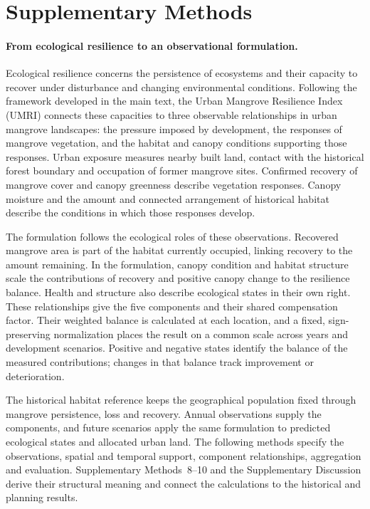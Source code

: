 \tableofcontents
\clearpage

\section{Supplementary Methods}

\paragraph{From ecological resilience to an observational formulation.}
Ecological resilience concerns the persistence of ecosystems and their capacity to recover under disturbance and changing environmental conditions\cite{ref035,ref042,Scheffer2001}. Following the framework developed in the main text, the Urban Mangrove Resilience Index (UMRI) connects these capacities to three observable relationships in urban mangrove landscapes: the pressure imposed by development, the responses of mangrove vegetation, and the habitat and canopy conditions supporting those responses. Urban exposure measures nearby built land, contact with the historical forest boundary and occupation of former mangrove sites. Confirmed recovery of mangrove cover and canopy greenness describe vegetation responses. Canopy moisture and the amount and connected arrangement of historical habitat describe the conditions in which those responses develop.

The formulation follows the ecological roles of these observations. Recovered mangrove area is part of the habitat currently occupied, linking recovery to the amount remaining. In the formulation, canopy condition and habitat structure scale the contributions of recovery and positive canopy change to the resilience balance. Health and structure also describe ecological states in their own right. These relationships give the five components and their shared compensation factor. Their weighted balance is calculated at each location, and a fixed, sign-preserving normalization places the result on a common scale across years and development scenarios. Positive and negative states identify the balance of the measured contributions; changes in that balance track improvement or deterioration.

The historical habitat reference keeps the geographical population fixed through mangrove persistence, loss and recovery. Annual observations supply the components, and future scenarios apply the same formulation to predicted ecological states and allocated urban land. The following methods specify the observations, spatial and temporal support, component relationships, aggregation and evaluation. Supplementary Methods~8--10 and the Supplementary Discussion derive their structural meaning and connect the calculations to the historical and planning results.

